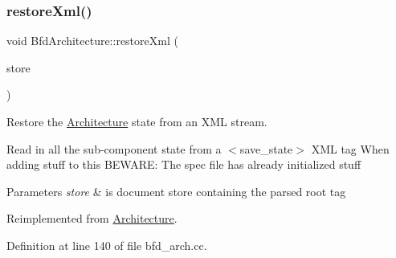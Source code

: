 \subsubsection{\texorpdfstring{restoreXml()}{restoreXml()}}
{\footnotesize\ttfamily void Bfd\+Architecture\+::restore\+Xml (\begin{DoxyParamCaption}\item[{\mbox{\hyperlink{class_document_storage}{Document\+Storage}} \&}]{store }\end{DoxyParamCaption})\hspace{0.3cm}{\ttfamily [virtual]}}



Restore the \mbox{\hyperlink{class_architecture}{Architecture}} state from an X\+ML stream. 

Read in all the sub-\/component state from a $<$save\+\_\+state$>$ X\+ML tag When adding stuff to this B\+E\+W\+A\+RE\+: The spec file has already initialized stuff 
\begin{DoxyParams}{Parameters}
{\em store} & is document store containing the parsed root tag \\
\hline
\end{DoxyParams}


Reimplemented from \mbox{\hyperlink{class_architecture_ab15a398b9f84dd62ad36d1e83895783a}{Architecture}}.



Definition at line 140 of file bfd\+\_\+arch.\+cc.


